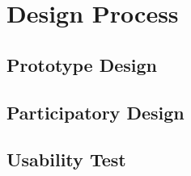 
\section{Design Process}
\subsection{Prototype Design}
\subsection{Participatory Design}
\subsection{Usability Test}
